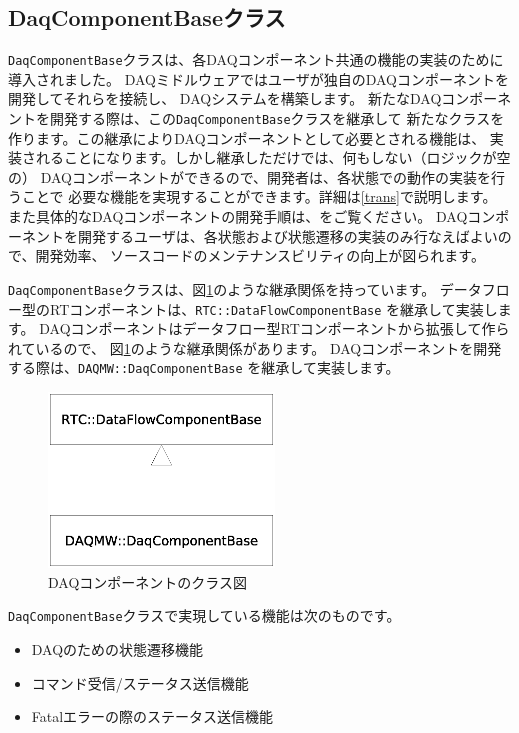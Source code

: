 \documentclass[a4j,10pt,dvips,onecolumn,oneside,final]{jarticle}%
\begin{document}
\subsection{DaqComponentBaseクラス}
\verb|DaqComponentBase|クラスは、各DAQコンポーネント共通の機能の実装のために導入されました。
DAQミドルウェアではユーザが独自のDAQコンポーネントを開発してそれらを接続し、
DAQシステムを構築します。
新たなDAQコンポーネントを開発する際は、この\verb|DaqComponentBase|クラスを継承して
新たなクラスを作ります。この継承によりDAQコンポーネントとして必要とされる機能は、
実装されることになります。しかし継承しただけでは、何もしない（ロジックが空の）
DAQコンポーネントができるので、開発者は、各状態での動作の実装を行うことで
必要な機能を実現することができます。詳細は\ref{trans}で説明します。
また具体的なDAQコンポーネントの開発手順は、\cite{COMP-DEV}をご覧ください。
DAQコンポーネントを開発するユーザは、各状態および状態遷移の実装のみ行なえばよいので、開発効率、
ソースコードのメンテナンスビリティの向上が図られます。

\verb|DaqComponentBase|クラスは、図\ref{class-diag.fig}のような継承関係を持っています。
データフロー型のRTコンポーネントは、\verb|RTC::DataFlowComponentBase| を継承して実装します。
DAQコンポーネントはデータフロー型RTコンポーネントから拡張して作られているので、
図\ref{class-diag.fig}のような継承関係があります。
DAQコンポーネントを開発する際は、\verb|DAQMW::DaqComponentBase| を継承して実装します。
\begin{figure}[htbp]
 \begin{center}
  \includegraphics[width=60mm]{class-diag.eps}
  \caption{DAQコンポーネントのクラス図}
  \label{class-diag.fig}
 \end{center}
\end{figure}

\verb|DaqComponentBase|クラスで実現している機能は次のものです。
\begin{itemize}
\item DAQのための状態遷移機能
\item コマンド受信/ステータス送信機能
\item Fatalエラーの際のステータス送信機能
\end{itemize}
\end{document}
